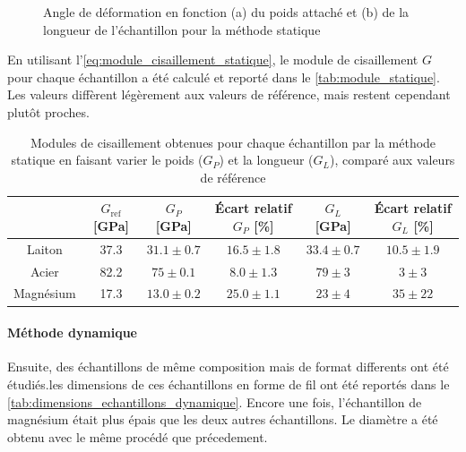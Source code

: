 \begin{figure}[h]
\begin{subfigure}{0.45\linewidth}
        \caption{}
        \label{fig:statique_longueur}
    \end{subfigure}
    \caption{Angle de déformation en fonction (a) du poids attaché et (b) de la longueur de l'échantillon pour la méthode statique}
\end{figure}

En utilisant l'\autoref{eq:module_cisaillement_statique}, le module de cisaillement $G$ pour chaque échantillon a été calculé et reporté dans le \autoref{tab:module_statique}. Les valeurs diffèrent légèrement aux valeurs de référence, mais restent cependant plutôt proches.

\begin{table}[h]
    \centering
    \begin{tabulary}{\linewidth}{c c c c c c}
        \toprule
        & $G_\textrm{ref}$ [\si{\giga\pascal}] & $G_P$ [\si{\giga\pascal}] & Écart relatif $G_P$ [\%] & $G_L$ [\si{\giga\pascal}] & Écart relatif $G_L$ [\%] \\
        \midrule
        Laiton & 37.3 & $31.1\pm0.7$ & $16.5 \pm 1.8$ & $33.4\pm0.7$ & $10.5 \pm 1.9$ \\
        Acier & 82.2 & $75\pm0.1$ & $8.0 \pm 1.3$ & $79\pm3$ & $3 \pm 3 $ \\
        Magnésium & 17.3 & $13.0\pm0.2$ & $25.0 \pm 1.1$ & $23\pm4$ & $35 \pm 22$ \\
        \bottomrule
    \end{tabulary}
    \caption{Modules de cisaillement obtenues pour chaque échantillon par la méthode statique en faisant varier le poids ($G_P$) et la longueur ($G_L$), comparé aux valeurs de référence}
    \label{tab:module_statique}
\end{table}

\paragraph{Méthode dynamique}
Ensuite, des échantillons de même composition mais de format differents ont été étudiés.les dimensions de ces échantillons en forme de fil ont été reportés dans le \autoref{tab:dimensions_echantillons_dynamique}. Encore une fois, l'échantillon de magnésium était plus épais que les deux autres échantillons. Le diamètre a été obtenu avec le même procédé que précedement.

